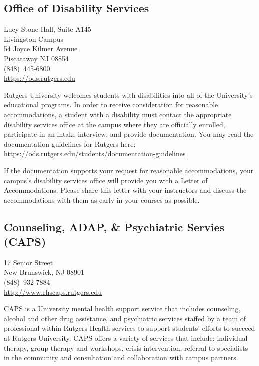 \documentclass{article}
\begin{document}
\subsection*{Office of Disability Services}
Lucy Stone Hall, Suite A145 \\ Livingston Campus \\ 54 Joyce Kilmer Avenue \\ Piscataway NJ 08854 \\ (848)~445-6800 \\ \href{https://ods.rutgers.edu}{https://ods.rutgers.edu}
\par
\hfill \par
\noindent Rutgers University welcomes students with disabilities into all of the University's educational programs. In order to receive consideration for reasonable accommodations, a student with a disability must contact the appropriate disability services office at the campus where they are officially enrolled, participate in an intake interview, and provide documentation. You may read the documentation guidelines for Rutgers here: \\
\href{https://ods.rutgers.edu/students/documentation-guidelines}{https://ods.rutgers.edu/students/documentation-guidelines} \par
\noindent If the documentation supports your request for reasonable accommodations, your campus’s disability services office will provide you with a Letter of Accommodations. Please share this letter with your instructors and discuss the accommodations with them as early in your courses as possible.


\subsection*{Counseling, ADAP, \& Psychiatric Servies (CAPS)}
17 Senior Street \\ New Brunswick, NJ 08901 \\ (848)~932-7884 \\ \href{http://www.rhscaps.rutgers.edu}{http://www.rhscaps.rutgers.edu}
\par
\hfill \par
\noindent CAPS is a University mental health support service that includes counseling, alcohol and other drug assistance, and psychiatric services staffed by a team of professional within Rutgers Health services to support students’ efforts to succeed at Rutgers University. CAPS offers a variety of services that include: individual therapy, group therapy and workshops, crisis intervention, referral to specialists in the community and consultation and collaboration with campus partners.
\end{document}
